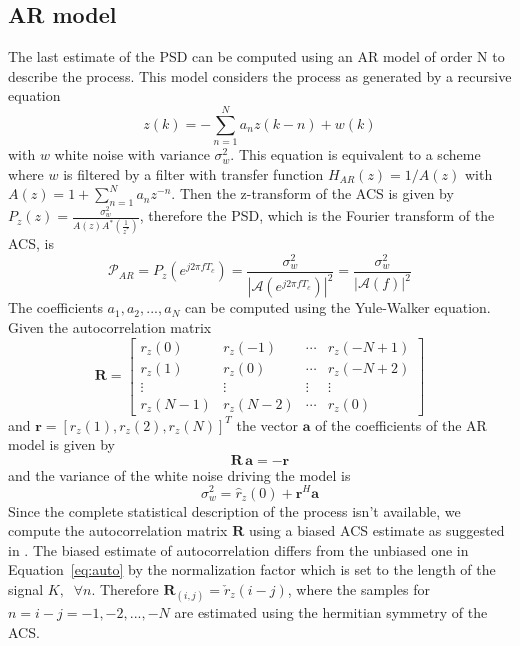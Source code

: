 \documentclass[10pt]{article}
\numberwithin{equation}{section}
\begin{document}
\subsection{AR model}
\label{sec:ar}
The last estimate of the PSD can be computed using an AR model of order N to describe the process. This model considers the process as generated by a recursive equation
\begin{equation}
  z(k) = - \sum_{n=1}^N a_n z(k-n) + w(k)
\end{equation}
with $w$ white noise with variance $\sigma_w^2$. This equation is equivalent to a scheme where $w$ is filtered by a filter with transfer function $H_{AR}(z) = 1/A(z)$ with $A(z) = 1 + \sum_{n=1}^N a_n z^{-n}$. Then the z-transform of the ACS is given by $P_z(z) = \frac{\sigma_w^2}{A(z)A^*(\frac{1}{z^*})}$, therefore the PSD, which is the Fourier transform of the ACS, is
\begin{equation}
  \mathcal{P}_{AR} = P_z(e^{j 2 \pi f T_c}) = \frac{\sigma_w^2}{|\mathcal{A}(e^{j 2 \pi f T_c})|^2} = \frac{\sigma_w^2}{|\mathcal{A}(f)|^2}
  \label{eq:arpsd}
\end{equation}
The coefficients $a_1, a_2, ..., a_N$ can be computed using the Yule-Walker equation. Given the autocorrelation matrix
\begin{equation}
  \mathbf{R} =
  \begin{bmatrix}
     r_z(0) &  r_z(-1) & \cdots &  r_z(-N+1) \\
     r_z(1) &  r_z(0)  & \cdots &  r_z(-N+2) \\
    \vdots       & \vdots        & \vdots & \vdots \\
     r_z(N-1) &  r_z(N-2) & \cdots &  r_z(0)
  \end{bmatrix}
\end{equation}
and $ \mathbf{r} = [r_z(1),  r_z(2),  r_z(N)]^T $ the vector $\mathbf{a}$ of the coefficients of the AR model is given by
\begin{equation}
  \mathbf{R} \, \mathbf{a} = - \mathbf{r}
  \label{eq:yw}
\end{equation}
and the variance of the white noise driving the model is
\begin{equation}
  \sigma_w^2 = \hat{r}_z(0) + \mathbf{r}^H\mathbf{a}
\end{equation}
Since the complete statistical description of the process isn't available, we compute the autocorrelation matrix $\mathbf{R}$ using a biased ACS estimate as suggested in \cite{bc}. The biased estimate of autocorrelation differs from the unbiased one in Equation~\ref{eq:auto} by the normalization factor which is set to the length of the signal $K, \; \; \forall n$. Therefore $\mathbf{R}_{(i, j)} = \check{r}_z(i - j)$, where the samples for $n = i - j=-1, -2, ..., -N$ are estimated using the hermitian symmetry of the ACS. \\
\end{document}
